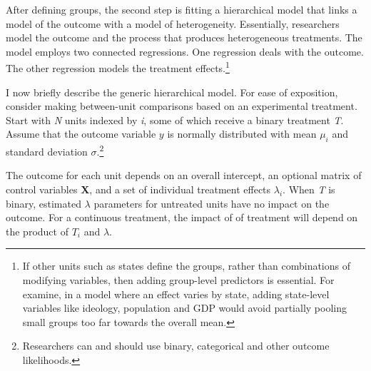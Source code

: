 \documentclass[12pt]{article}
\begin{document}


After defining groups, the second step is fitting a hierarchical model that links a model of the outcome with a model of heterogeneity.
Essentially, researchers model the outcome and the process that produces heterogeneous treatments. 
The model employs two connected regressions.
One regression deals with the outcome.
The other regression models the treatment effects.\footnote{If other units such as states define the groups, rather than combinations of modifying variables, then adding group-level predictors is essential. For examine, in a model where an effect varies by state, adding state-level variables like ideology, population and GDP would avoid partially pooling small groups too far towards the overall mean.}


I now briefly describe the generic hierarchical model. 
For ease of exposition, consider making between-unit comparisons based on an experimental treatment.    
Start with \textit{N} units indexed by \textit{i}, some of which receive a binary treatment \textit{T}.
Assume that the outcome variable ${y}$ is normally distributed with mean $\mu_i$ and standard deviation $\sigma$.\footnote{Researchers can and should use binary, categorical and other outcome likelihoods.}


The outcome for each unit depends on an overall intercept, an optional matrix of control variables \textbf{X}, and a set of individual treatment effects $\lambda_i$.
When \textit{T} is binary, estimated $\lambda$ parameters for untreated units have no impact on the outcome. 
For a continuous treatment, the impact of of treatment will depend on the product of $\textit{T}_i$ and $\lambda$.
\end{document}
